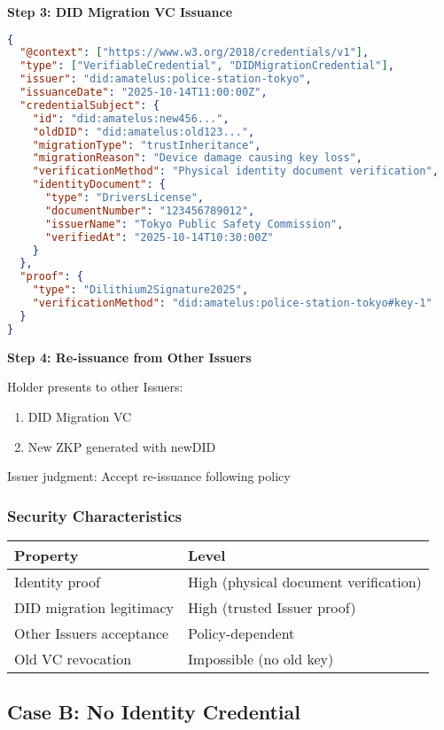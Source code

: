 \textbf{Step 3: DID Migration VC Issuance}

\begin{lstlisting}[language=json]
{
  "@context": ["https://www.w3.org/2018/credentials/v1"],
  "type": ["VerifiableCredential", "DIDMigrationCredential"],
  "issuer": "did:amatelus:police-station-tokyo",
  "issuanceDate": "2025-10-14T11:00:00Z",
  "credentialSubject": {
    "id": "did:amatelus:new456...",
    "oldDID": "did:amatelus:old123...",
    "migrationType": "trustInheritance",
    "migrationReason": "Device damage causing key loss",
    "verificationMethod": "Physical identity document verification",
    "identityDocument": {
      "type": "DriversLicense",
      "documentNumber": "123456789012",
      "issuerName": "Tokyo Public Safety Commission",
      "verifiedAt": "2025-10-14T10:30:00Z"
    }
  },
  "proof": {
    "type": "Dilithium2Signature2025",
    "verificationMethod": "did:amatelus:police-station-tokyo#key-1"
  }
}
\end{lstlisting}

\textbf{Step 4: Re-issuance from Other Issuers}

Holder presents to other Issuers:
\begin{enumerate}
  \item DID Migration VC
  \item New ZKP generated with newDID
\end{enumerate}

Issuer judgment: Accept re-issuance following policy

\subsubsection{Security Characteristics}

\begin{table}[h]
\centering
\begin{tabular}{|l|l|}
\hline
\textbf{Property} & \textbf{Level} \\
\hline
Identity proof & High (physical document verification) \\
DID migration legitimacy & High (trusted Issuer proof) \\
Other Issuers acceptance & Policy-dependent \\
Old VC revocation & Impossible (no old key) \\
\hline
\end{tabular}
\end{table}

\subsection{Case B: No Identity Credential}

